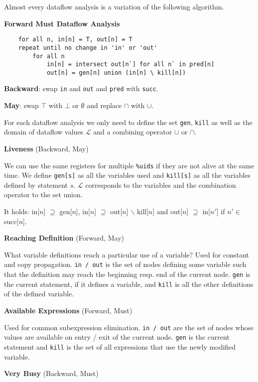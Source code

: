 Almost every dataflow analysis is a variation of the following algorithm.\smallskip

\textbf{Forward Must Dataflow Analysis}
\begin{lstlisting}
	for all n, in[n] = T, out[n] = T
	repeat until no change in 'in' or 'out'
		for all n
			in[n] = intersect out[n`] for all n` in pred[n]
			out[n] = gen[n] union (in[n] \ kill[n])	
\end{lstlisting}\medskip

\textbf{Backward}: swap \texttt{in} and \texttt{out} and \texttt{pred} with \texttt{succ}.\medskip

\textbf{May}: swap $\top$ with $\bot$ or $\emptyset$ and replace $\cap$ with $\cup$.\medskip

For each dataflow analysis we only need to define the set \texttt{gen}, \texttt{kill} as well as the domain of dataflow values $\mathcal L$ and a combining operator $\cup$ or $\cap$.\medskip

\textbf{Liveness} (Backward, May)\medskip

We can use the same registers for multiple \texttt{\%uids} if they are not alive at the same time. We define \texttt{gen[s]} as all the variables used and \texttt{kill[s]} as all the variables defined by statement $s$. $\mathcal L$ corresponds to the variables and the combination operator to the set union.\medskip

It holds: in[$n$] $\supseteq$ gen[$n$], in[$n$] $\supseteq$ out[$n$] $\backslash$ kill[$n$] and out[$n$] $\supseteq$ in[$n'$] if $n' \in $ succ[$n$].\medskip

\textbf{Reaching Definition} (Forward, May)\medskip

What variable definitions reach a particular use of a variable? Used for constant and copy propagation. \texttt{in / out} is the set of nodes defining some variable such that the definition may reach the beginning resp. end of the current node. \texttt{gen} is the current statement, if it defines a variable, and \texttt{kill} is all the other definitions of the defined variable. \medskip

\textbf{Available Expressions} (Forward, Must)\medskip

Used for common subexpression elimination. \texttt{in / out} are the set of nodes whose values are available on entry / exit of the current node. \texttt{gen} is the current statement and \texttt{kill} is the set of all expressions that use the newly modified variable.\medskip

\textbf{Very Busy} (Backward, Must)\medskip

